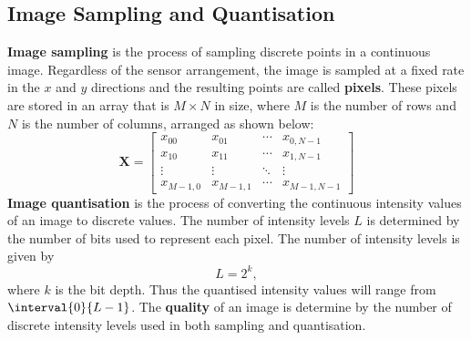 \documentclass{article}
\begin{document}
\subsection{Image Sampling and Quantisation}
\textbf{Image sampling} is the process of sampling discrete points in a
continuous image. Regardless of the sensor arrangement, the image is
sampled at a fixed rate in the \(x\) and \(y\) directions and the
resulting points are called \textbf{pixels}. These pixels are stored in
an array that is \(M \times N\) in size, where \(M\) is the number of
rows and \(N\) is the number of columns, arranged as shown below:
\begin{equation*}
    \symbf{X} =
    \begin{bmatrix}
        x_{00}    & x_{01}    & \cdots & x_{0,N-1}   \\
        x_{10}    & x_{11}    & \cdots & x_{1,N-1}   \\
        \vdots    & \vdots    & \ddots & \vdots      \\
        x_{M-1,0} & x_{M-1,1} & \cdots & x_{M-1,N-1}
    \end{bmatrix}
\end{equation*}
\textbf{Image quantisation} is the process of converting the continuous
intensity values of an image to discrete values. The number of
intensity levels \(L\) is determined by the number of bits used to
represent each pixel. The number of intensity levels is given by
\begin{equation*}
    L = 2^k,
\end{equation*}
where \(k\) is the bit depth. Thus the quantised intensity values will
range from \(\interval{0}{L-1}\). The \textbf{quality} of an image is
determine by the number of discrete intensity levels used in both
sampling and quantisation.
\end{document}
